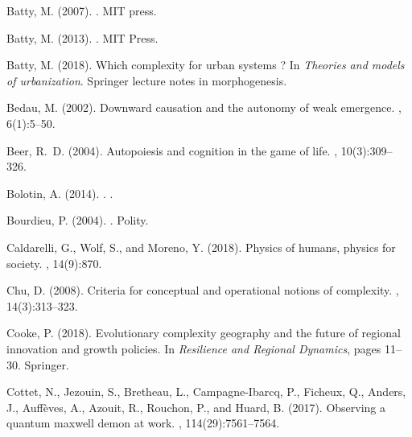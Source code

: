 \begin{thebibliography}{}
Batty, M. (2007).
.
\newblock MIT press.

Batty, M. (2013).
.
\newblock MIT Press.

Batty, M. (2018).
\newblock Which complexity for urban systems ?
\newblock In {\em Theories and models of urbanization}. Springer lecture notes
  in morphogenesis.

Bedau, M. (2002).
\newblock Downward causation and the autonomy of weak emergence.
,
  6(1):5--50.

Beer, R.~D. (2004).
\newblock Autopoiesis and cognition in the game of life.
, 10(3):309--326.

{Bolotin}, A. (2014).
.
.

Bourdieu, P. (2004).
.
\newblock Polity.

Caldarelli, G., Wolf, S., and Moreno, Y. (2018).
\newblock Physics of humans, physics for society.
, 14(9):870.

Chu, D. (2008).
\newblock Criteria for conceptual and operational notions of complexity.
, 14(3):313--323.

Cooke, P. (2018).
\newblock Evolutionary complexity geography and the future of regional
  innovation and growth policies.
\newblock In {\em Resilience and Regional Dynamics}, pages 11--30. Springer.

Cottet, N., Jezouin, S., Bretheau, L., Campagne-Ibarcq, P., Ficheux, Q.,
  Anders, J., Auff{\`e}ves, A., Azouit, R., Rouchon, P., and Huard, B. (2017).
\newblock Observing a quantum maxwell demon at work.
,
  114(29):7561--7564.


\end{thebibliography}

